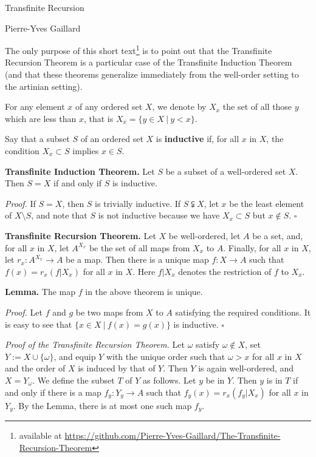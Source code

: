 \documentclass[12pt,letterpaper]{article}
\newcommand{\nn}{\noindent}
\begin{document}
\begin{center}
{\Huge Transfinite Recursion}\bigskip 

{\normalsize Pierre-Yves Gaillard}
\end{center}

\nn The only purpose of this short text\footnote{available at \url{https://github.com/Pierre-Yves-Gaillard/The-Transfinite-Recursion-Theorem}} is to point out that the Transfinite Recursion Theorem is a particular case of the Transfinite Induction Theorem (and that these theorems generalize immediately from the well-order setting to the artinian setting). 

For any element $x$ of any ordered set $X$, we denote by $X_x$ the set of all those $y$ which are less than $x$, that is $X_x=\{y\in X\ |\ y<x\}$. 

Say that a subset $S$ of an ordered set $X$ is \textbf{inductive} if, for all $x$ in $X$, the condition $X_x\subset S$ implies $x\in S$. 

\nn\textbf{Transfinite Induction Theorem.} Let $S$ be a subset of a well-ordered set $X$. Then $S=X$ if and only if $S$ is inductive. 

\nn\emph{Proof.} If $S=X$, then $S$ is trivially inductive. If $S\subsetneqq X$, let $x$ be the least element of $X\setminus S$, and note that $S$ is not inductive because we have $X_x\subset S$ but $x\notin S$. $\square$

\nn\textbf{Transfinite Recursion Theorem.} Let $X$ be well-ordered, let $A$ be a set, and, for all $x$ in $X$, let $A^{X_x}$ be the set of all maps from $X_x$ to $A$. Finally, for all $x$ in $X$, let $r_x:A^{X_x}\to A$ be a map. Then there is a unique map $f:X\to A$ such that $f(x)=r_x(f|X_x)$ for all $x$ in $X$. Here $f|X_x$ denotes the restriction of $f$ to $X_x$. 

\nn\textbf{Lemma.} The map $f$ in the above theorem is unique. 

\nn\emph{Proof.} Let $f$ and $g$ be two maps from $X$ to $A$ satisfying the required conditions. It is easy to see that $\{x\in X\ |\ f(x)=g(x)\}$ is inductive. $\square$ 

\nn\emph{Proof of the Transfinite Recursion Theorem.} Let $\omega$ satisfy $\omega\notin X$, set $Y:=X\cup\{\omega\}$, and equip $Y$ with the unique order such that $\omega>x$ for all $x$ in $X$ and the order of $X$ is induced by that of $Y$. Then $Y$ is again well-ordered, and $X=Y_\omega$. We define the subset $T$ of $Y$ as follows. Let $y$ be in $Y$. Then $y$ is in $T$ if and only if there is a map $f_y:Y_y\to A$ such that $f_y(x)=r_x(f_y|X_x)$ for all $x$ in $Y_y$. By the Lemma, there is at most one such map $f_y$. 
\end{document}
